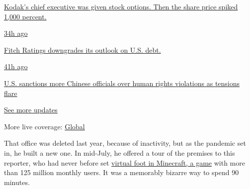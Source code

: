 \href{https://www.nytimes3xbfgragh.onion/live/2020/07/31/business/stock-market-today-coronavirus?action=click\&pgtype=Article\&state=default\&region=MAIN_CONTENT_1\&context=storylines_live_updates\#kodaks-chief-executive-was-given-stock-options-then-the-share-price-spiked-1000-percent}{Kodak's
chief executive was given stock options. Then the share price spiked
1,000 percent.}

\href{https://www.nytimes3xbfgragh.onion/live/2020/07/31/business/stock-market-today-coronavirus?action=click\&pgtype=Article\&state=default\&region=MAIN_CONTENT_1\&context=storylines_live_updates\#fitch-ratings-downgrades-its-outlook-on-us-debt}{34h
ago}

\href{https://www.nytimes3xbfgragh.onion/live/2020/07/31/business/stock-market-today-coronavirus?action=click\&pgtype=Article\&state=default\&region=MAIN_CONTENT_1\&context=storylines_live_updates\#fitch-ratings-downgrades-its-outlook-on-us-debt}{Fitch
Ratings downgrades its outlook on U.S. debt.}

\href{https://www.nytimes3xbfgragh.onion/live/2020/07/31/business/stock-market-today-coronavirus?action=click\&pgtype=Article\&state=default\&region=MAIN_CONTENT_1\&context=storylines_live_updates\#us-sanctions-more-chinese-officials-over-human-rights-violations-as-tensions-flare}{41h
ago}

\href{https://www.nytimes3xbfgragh.onion/live/2020/07/31/business/stock-market-today-coronavirus?action=click\&pgtype=Article\&state=default\&region=MAIN_CONTENT_1\&context=storylines_live_updates\#us-sanctions-more-chinese-officials-over-human-rights-violations-as-tensions-flare}{U.S.
sanctions more Chinese officials over human rights violations as
tensions flare}

\href{https://www.nytimes3xbfgragh.onion/live/2020/07/31/business/stock-market-today-coronavirus?action=click\&pgtype=Article\&state=default\&region=MAIN_CONTENT_1\&context=storylines_live_updates}{See
more updates}

More live coverage:
\href{https://www.nytimes3xbfgragh.onion/2020/08/01/world/coronavirus-covid-19.html?action=click\&pgtype=Article\&state=default\&region=MAIN_CONTENT_1\&context=storylines_live_updates}{Global}

That office was deleted last year, because of inactivity, but as the
pandemic set in, he built a new one. In mid-July, he offered a tour of
the premises to this reporter, who had never before set
\href{https://www.nytimes3xbfgragh.onion/2016/04/17/magazine/the-minecraft-generation.html}{virtual
foot in Minecraft, a game} with more than 125 million monthly users. It
was a memorably bizarre way to spend 90 minutes.

